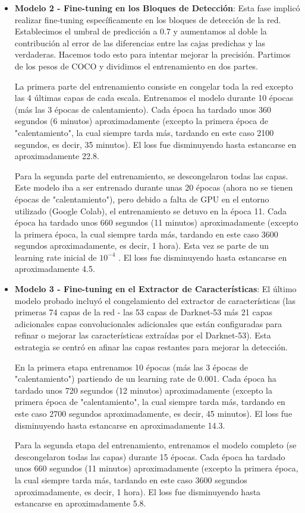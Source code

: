 \documentclass[10pt,twocolumn,letterpaper]{article}
\begin{document}
\begin{itemize}
    \item \textbf{Modelo 2 - Fine-tuning en los Bloques de Detección}: Esta fase implicó realizar fine-tuning específicamente en los bloques de detección de la red. Establecimos el umbral de predicción a 0.7 y aumentamos al doble la contribución al error de las diferencias entre las cajas predichas y las verdaderas. Hacemos todo esto para intentar mejorar la precisión. Partimos de los pesos de COCO y dividimos el entrenamiento en dos partes.

La primera parte del entrenamiento consiste en congelar toda la red excepto las 4 últimas capas de cada escala. Entrenamos el modelo durante 10 épocas (más las 3 épocas de calentamiento). Cada época ha tardado unos 360 segundos (6 minutos) aproximadamente (excepto la primera época de "calentamiento", la cual siempre tarda más, tardando en este caso 2100 segundos, es decir, 35 minutos). El loss fue disminuyendo hasta estancarse en aproximadamente 22.8.

Para la segunda parte del entrenamiento, se descongelaron todas las capas. Este modelo iba a ser entrenado durante unas 20 épocas (ahora no se tienen épocas de "calentamiento"), pero debido a falta de GPU en el entorno utilizado (Google Colab), el entrenamiento se detuvo en la época 11. Cada época ha tardado unos 660 segundos (11 minutos) aproximadamente (excepto la primera época, la cual siempre tarda más, tardando en este caso 3600 segundos aproximadamente, es decir, 1 hora). Esta vez se parte de un learning rate inicial de $10^{-4}$ . El loss fue disminuyendo hasta estancarse en aproximadamente 4.5.

    \item \textbf{Modelo 3 - Fine-tuning en el Extractor de Características}: El último modelo probado incluyó el congelamiento del extractor de características (las primeras 74 capas de la red - las 53 capas de Darknet-53 más 21 capas adicionales capas convolucionales adicionales que están configuradas para refinar o mejorar las características extraídas por el Darknet-53). Esta estrategia se centró en afinar las capas restantes para mejorar la detección.

En la primera etapa entrenamos 10 épocas (más las 3 épocas de "calentamiento") partiendo de un learning rate de 0.001. Cada época ha tardado unos 720 segundos (12 minutos) aproximadamente (excepto la primera época de "calentamiento", la cual siempre tarda más, tardando en este caso 2700 segundos aproximadamente, es decir, 45 minutos). El loss fue disminuyendo hasta estancarse en aproximadamente 14.3.

Para la segunda etapa del entrenamiento, entrenamos el modelo completo (se descongelaron todas las capas) durante 15 épocas. Cada época ha tardado unos 660 segundos (11 minutos) aproximadamente (excepto la primera época, la cual siempre tarda más, tardando en este caso 3600 segundos aproximadamente, es decir, 1 hora). El loss fue disminuyendo hasta estancarse en aproximadamente 5.8.
\end{itemize}
\end{document}
